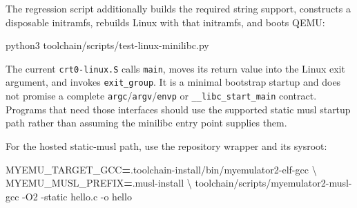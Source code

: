 \documentclass[
  oneside,
  openany]{book}
\newenvironment{Shaded}{\begin{snugshade}}{\end{snugshade}}
\newcommand{\AttributeTok}[1]{\textcolor[rgb]{0.13,0.29,0.53}{#1}}
\newcommand{\DataTypeTok}[1]{\textcolor[rgb]{0.13,0.29,0.53}{#1}}
\newcommand{\ExtensionTok}[1]{#1}
\newcommand{\NormalTok}[1]{#1}
\newcommand{\OperatorTok}[1]{\textcolor[rgb]{0.81,0.36,0.00}{\textbf{#1}}}
\newcommand{\VariableTok}[1]{\textcolor[rgb]{0.00,0.00,0.00}{#1}}
\begin{document}
\begin{Shaded}
\end{Shaded}

The regression script additionally builds the required string support,
constructs a disposable initramfs, rebuilds Linux with that initramfs,
and boots QEMU:

\begin{Shaded}
\begin{Highlighting}[]
\ExtensionTok{python3}\NormalTok{ toolchain/scripts/test{-}linux{-}minilibc.py}
\end{Highlighting}
\end{Shaded}

The current \texttt{crt0-linux.S} calls \texttt{main}, moves its return
value into the Linux exit argument, and invokes \texttt{exit\_group}. It
is a minimal bootstrap startup and does not promise a complete
\texttt{argc}/\texttt{argv}/\texttt{envp} or
\texttt{\_\_libc\_start\_main} contract. Programs that need those
interfaces should use the supported static musl startup path rather than
assuming the minilibc entry point supplies them.

For the hosted static-musl path, use the repository wrapper and its
sysroot:

\begin{Shaded}
\begin{Highlighting}[]
\VariableTok{MYEMU\_TARGET\_GCC}\OperatorTok{=}\NormalTok{.toolchain{-}install/bin/myemulator2{-}elf{-}gcc }\DataTypeTok{\textbackslash{}}
\VariableTok{MYEMU\_MUSL\_PREFIX}\OperatorTok{=}\NormalTok{.musl{-}install }\DataTypeTok{\textbackslash{}}
\ExtensionTok{toolchain/scripts/myemulator2{-}musl{-}gcc} \AttributeTok{{-}O2} \AttributeTok{{-}static}\NormalTok{ hello.c }\AttributeTok{{-}o}\NormalTok{ hello}
\end{Highlighting}
\end{Shaded}
\end{document}
